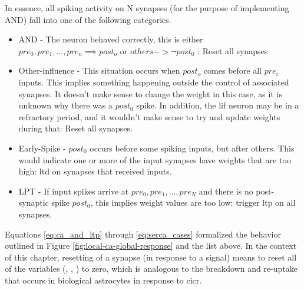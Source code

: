 


In essence, all spiking activity on N synapses (for the purpose of implementing
AND) fall into one of the following categories.
\begin{itemize}
\item AND - The neuron behaved correctly, this is either $pre_0, pre_1, ...,
  pre_n \implies post_o$ or $others -> \neg post_0$ : Reset all synapses
\item Other-influence - This situation occurs when $post_o$ comes before all
  $pre_i$ inputs. This implies something happening outside the control of
  associated synapses. It doesn't make sense to change the weight in this case,
  as it is unknown why there was a $post_0$ spike. In addition, the \Gls{lif} neuron
  may be in a refractory period, and it wouldn't make sense to try and update
  weights during that: Reset all synapses.
\item Early-Spike - $post_0$ occurs before some spiking inputs, but after
  others. This would indicate one or more of the input synapses have weights
  that are too high: \Gls{ltd} on synapses that received inputs.
\item LPT - If input spikes arrive at $pre_0, pre_1, ..., pre_N$ and there is no
  post-synaptic spike $post_0$, this implies weight values are too low: trigger
  \Gls{ltp} on all synapses.
\end{itemize}

Equations \ref{eq:ca_and_ltp} through \ref{eq:serca_cases} formalized the behavior outlined
in Figure \ref{fig:local-ca-global-response} and the list above. In the context
of this chapter, resetting of a synapse (in response to a \serca signal) means
to reset all of the variables (\ca, \ipt, \kp) to zero, which is analogous to
the breakdown and re-uptake that occurs in biological astrocytes in response to
\gls{cicr}.

